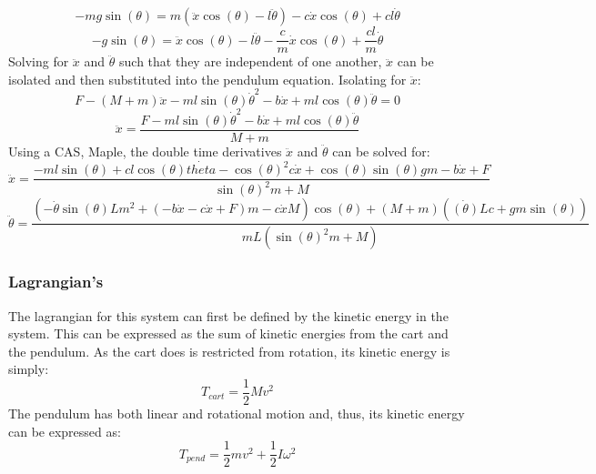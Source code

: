 \documentclass{article}
\begin{document}
\[-mg\sin(\theta)=m(\ddot{x}\cos(\theta)-l\ddot{\theta})-c\dot{x}\cos{(\theta)}+cl\dot{\theta}\]
\[-g\sin(\theta)=\ddot{x}\cos(\theta)-l\ddot{\theta}-\frac{c}{m}\dot{x}\cos{(\theta)}+\frac{cl}{m}\dot{\theta}\]
Solving for $\ddot{x}$ and $\ddot{\theta}$ such that they are independent of one another, $\ddot{x}$ can
be isolated and then substituted into the pendulum equation. Isolating for $\ddot{x}$:
\[F-(M+m)\ddot{x}-ml\sin(\theta)\dot{\theta}^2-b\dot{x}+ml\cos(\theta)\ddot{\theta}=0 \]
\[\ddot{x}=\frac{F-ml\sin(\theta)\dot{\theta}^2-b\dot{x}+ml\cos(\theta)\ddot{\theta}}{M+m}\]
Using a CAS, Maple, the double time derivatives $\ddot{x}$ and $\ddot{\theta}$ can be solved for:
\[\ddot{x}=\frac{-ml\sin{(\theta)}+cl\cos{(\theta)}\dot{theta}-\cos{(\theta)}^2c\dot{x}+\cos{(\theta)}\sin{(\theta)}gm-b\dot{x}+F}{\sin{(\theta)}^2m+M}\]
\[\ddot{\theta}=\frac{(-\dot{\theta}\sin{(\theta)}Lm^2+(-b\dot{x}-c\dot{x}+F)m-c\dot{x}M)\cos{(\theta)}+(M+m)(\dot{(\theta)}Lc+gm\sin{(\theta)})}{mL(\sin{(\theta)}^2m+M)}\]
\subsubsection{Lagrangian's}
The lagrangian for this system can first be defined by the kinetic energy in the system. This can be expressed as the sum of kinetic energies from the cart and the 
pendulum. As the cart does is restricted from rotation, its kinetic energy is simply:
\[T_{cart}=\frac{1}{2}Mv^2\]
The pendulum has both linear and rotational motion and, thus, its kinetic energy can be expressed as:
\[T_{pend}=\frac{1}{2}mv^2+\frac{1}{2}I\omega^2\]
\end{document}
